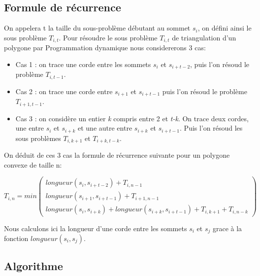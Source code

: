 \documentclass[a4paper,10pt]{article}
\begin{document}
\subsection{Formule de récurrence}



On appelera t la taille du sous-problème débutant au sommet \(s_i\), on défini ainsi le sous problème \(T_{i,t}\).
Pour résoudre le sous problème \(T_{i,t}\) de triangulation d'un polygone par Programmation dynamique nous considererons 3 cas:

\begin{itemize}
 \item Cas 1 : on trace une corde entre les sommets \(s_i\) et \(s_{i+t-2}\), puis l'on résoud le problème \(T_{i,t-1}\).
 \item Cas 2 : on trace une corde entre \(s_{i+1}\) et \(s_{i+t-1}\) puis l'on résoud le problème \(T_{i+1,t-1}\).
 \item Cas 3 : on considère un entier \emph{k} compris entre 2 et \emph{t-k}. On trace deux cordes, une entre \(s_{i}\) et \(s_{i+k}\) et une autre entre \(s_{i+k}\) et \(s_{i+t-1}\).
 Puis l'on résoud les sous problèmes \(T_{i,k+1}\) et \(T_{i+k,t-k}\).
\end{itemize}

On déduit de ces 3 cas la formule de récurrence suivante pour un polygone convexe de taille n: 

\begin{equation} 
T_{i,n} = min 
\begin{pmatrix} 
 longueur(s_i, s_{i+t-2}) + T_{i,n-1} \\
  longueur(s_{i+1}, s_{i+t-1}) + T_{i+1,n-1} \\
  longueur(s_i, s_{i+k}) + longueur(s_{i+k}, s_{i+t-1}) + T_{i,k+1} + T_{i,n-k}
\end{pmatrix}               
\end{equation}

Nous calculons ici la longueur d'une corde entre les sommets \(s_i\) et \(s_j\) grace à la fonction \( longueur(s_i, s_j) \). 

\subsection{Algorithme}
\end{document}
